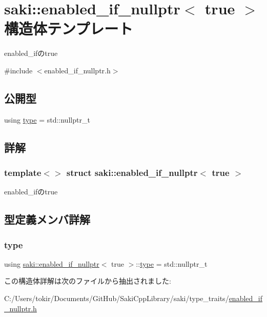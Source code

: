 \hypertarget{structsaki_1_1enabled__if__nullptr_3_01true_01_4}{}\section{saki\+:\+:enabled\+\_\+if\+\_\+nullptr$<$ true $>$ 構造体テンプレート}
\label{structsaki_1_1enabled__if__nullptr_3_01true_01_4}


enabled\+\_\+ifのtrue  




{\ttfamily \#include $<$enabled\+\_\+if\+\_\+nullptr.\+h$>$}

\subsection*{公開型}
\begin{DoxyCompactItemize}
\item 
using \mbox{\hyperlink{structsaki_1_1enabled__if__nullptr_3_01true_01_4_a2d6e660ea416615611921be376c6d624}{type}} = std\+::nullptr\+\_\+t
\end{DoxyCompactItemize}


\subsection{詳解}
\subsubsection*{template$<$$>$\newline
struct saki\+::enabled\+\_\+if\+\_\+nullptr$<$ true $>$}

enabled\+\_\+ifのtrue 

\subsection{型定義メンバ詳解}
\mbox{\label{structsaki_1_1enabled__if__nullptr_3_01true_01_4_a2d6e660ea416615611921be376c6d624}} 
\subsubsection{\texorpdfstring{type}{type}}
{\footnotesize\ttfamily using \mbox{\hyperlink{structsaki_1_1enabled__if__nullptr}{saki\+::enabled\+\_\+if\+\_\+nullptr}}$<$ true $>$\+::\mbox{\hyperlink{structsaki_1_1enabled__if__nullptr_3_01true_01_4_a2d6e660ea416615611921be376c6d624}{type}} =  std\+::nullptr\+\_\+t}



この構造体詳解は次のファイルから抽出されました\+:\begin{DoxyCompactItemize}
\item 
C\+:/\+Users/tokir/\+Documents/\+Git\+Hub/\+Saki\+Cpp\+Library/saki/type\+\_\+traits/\mbox{\hyperlink{enabled__if__nullptr_8h}{enabled\+\_\+if\+\_\+nullptr.\+h}}\end{DoxyCompactItemize}
